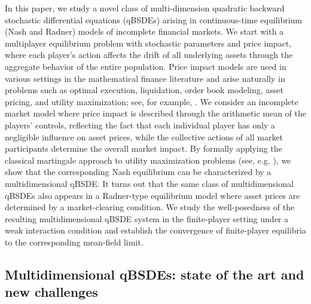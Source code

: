 \documentclass[10pt,a4paper]{article}
\theoremstyle{plain}
\theoremstyle{definition}
\numberwithin{equation}{section}
\begin{document}
In this paper, we study a novel class of multi-dimension quadratic backward stochastic differential equations (qBSDEs) arising in continuous-time equilibrium (Nash and Radner) models of incomplete financial markets. We start with a multiplayer equilibrium problem with stochastic parameters and price impact, where each player's action affects the drift of all underlying assets through the aggregate behavior of the entire population. Price impact models are used in various settings in the mathematical finance literature and arise naturally in problems such as optimal execution, liquidation, order book modeling, asset pricing, and utility maximization; see, for example, \cite{AC2001,Car2007,HXZ-2020, FHX1}. We consider an incomplete market model where price impact is described through the arithmetic mean of the players' controls, reflecting the fact that each individual player has only a negligible influence on asset prices, while the collective actions of all market participants determine the overall market impact. By formally applying the classical martingale approach to utility maximization problems (see, e.g. \cite{HIM05}), we show that the corresponding Nash equilibrium can be characterized by a multidimensional qBSDE. %
It turns out that the same class of multidimensional qBSDEs also appears in a Radner-type equilibrium model where asset prices are determined by a market-clearing condition. We study the well-posedness of the resulting multidimensional qBSDE system in the finite-player setting under a weak interaction condition and establish the convergence of finite-player equilibria to the corresponding mean-field limit. 

\subsection{Multidimensional qBSDEs: state of the art and new challenges}


\end{document}
